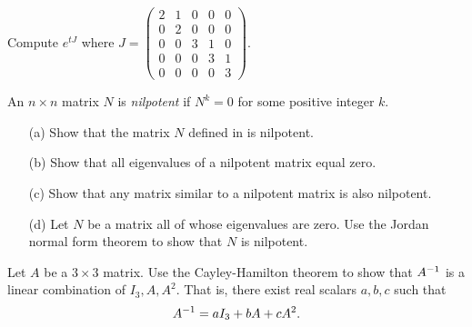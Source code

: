 \begin{exercise}  \label{c10.5.5B}
Compute $e^{tJ}$ where $J=\left(\begin{array}{rrrrr} 2 & 1 & 0 & 0 & 0\\  
0 & 2 & 0 & 0 & 0 \\ 0 & 0 & 3 & 1 & 0\\ 0 & 0 & 0 & 3 & 1\\
0 & 0 & 0 & 0 & 3 \end{array}\right)$.
\end{exercise}

\begin{exercise} \label{c10.5.5}
An $n\times n$ matrix $N$ is 
{\em nilpotent\/} 
if $N^k=0$ for some positive integer $k$.
\begin{itemize}
\item[(a)]  Show that the matrix $N$ defined in  is nilpotent.
\item[(b)]  Show that all eigenvalues of a nilpotent matrix equal zero.
\item[(c)]  Show that any matrix similar to a nilpotent matrix is also 
	nilpotent.
\item[(d)]  Let $N$ be a matrix all of whose eigenvalues are zero.  Use 
	the Jordan normal form theorem to show that $N$ is nilpotent.
\end{itemize}
\end{exercise}

\begin{exercise} \label{c10.5.5C}
Let $A$ be a $3\times 3$ matrix.  Use the Cayley-Hamilton theorem to show that
$A^{-1}$ is a linear combination of $I_3,A,A^2$.  That is, there exist real 
scalars $a,b,c$ such that 
\[
A^{-1} = aI_3 + bA + cA^2.
\]
\end{exercise}

\CEXER

